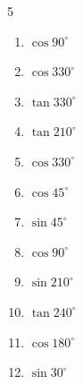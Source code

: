 \begin{multicols}{5}
\begin{enumerate}

  \item $\displaystyle \cos{90^\circ}$

        \phantom{$\displaystyle =0$}

  \item $\displaystyle \cos{330^\circ}$


  \item $\displaystyle \tan{330^\circ}$


  \item $\displaystyle \tan{210^\circ}$


  \item $\displaystyle \cos{330^\circ}$


  \item $\displaystyle \cos{45^\circ}$


  \item $\displaystyle \sin{45^\circ}$


  \item $\displaystyle \cos{90^\circ}$

        \phantom{$\displaystyle =0$}

  \item $\displaystyle \sin{210^\circ}$


  \item $\displaystyle \tan{240^\circ}$


  \item $\displaystyle \cos{180^\circ}$

        \phantom{$\displaystyle =-1$}

  \item $\displaystyle \sin{30^\circ}$



\end{enumerate}
\end{multicols}
